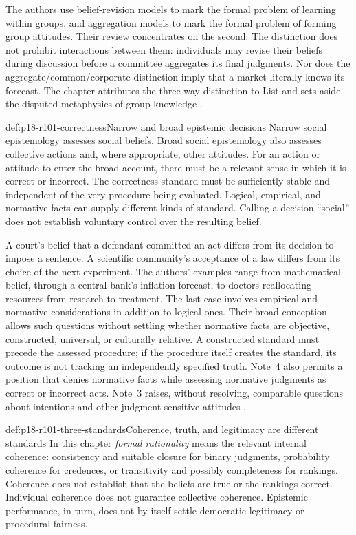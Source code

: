 The authors use belief-revision models to mark the formal problem of
learning within groups, and aggregation models to mark the formal
problem of forming group attitudes. Their review concentrates on the
second. The distinction does not prohibit interactions between them:
individuals may revise their beliefs during discussion before a committee
aggregates its final judgments. Nor does the aggregate/common/corporate
distinction imply that a market literally knows its forecast. The chapter
attributes the three-way distinction to List and sets aside the disputed
metaphysics of group knowledge
\parencite[p.~579]{DietrichSpiekermann2021Social}.

\begin{hbdefinition}{def:p18-r101-correctness}{Narrow and broad epistemic decisions}
Narrow social epistemology assesses social beliefs. Broad social
epistemology also assesses collective actions and, where appropriate,
other attitudes. For an action or attitude to enter the broad account,
there must be a relevant sense in which it is correct or incorrect.
The correctness standard must be sufficiently stable and independent
of the very procedure being evaluated. Logical, empirical, and normative
facts can supply different kinds of standard. Calling a decision
``social'' does not establish voluntary control over the resulting belief.
\end{hbdefinition}

A court's belief that a defendant committed an act differs from its
decision to impose a sentence. A scientific community's acceptance of a
law differs from its choice of the next experiment. The authors' examples
range from mathematical belief, through a central bank's inflation
forecast, to doctors reallocating resources from research to treatment.
The last case involves empirical and normative considerations in addition
to logical ones. Their broad conception allows such questions without
settling whether normative facts are objective, constructed, universal,
or culturally relative. A constructed standard must precede the assessed
procedure; if the procedure itself creates the standard, its outcome is
not tracking an independently specified truth. Note~4 also permits a
position that denies normative facts while assessing normative judgments
as correct or incorrect acts. Note~3 raises, without resolving, comparable
questions about intentions and other judgment-sensitive attitudes
\parencite[pp.~580 and 586--587, nn.~2--4]{DietrichSpiekermann2021Social}.

\begin{hbwarning}{def:p18-r101-three-standards}{Coherence, truth, and legitimacy are different standards}
In this chapter \emph{formal rationality} means the relevant internal
coherence: consistency and suitable closure for binary judgments,
probability coherence for credences, or transitivity and possibly
completeness for rankings. Coherence does not establish that the beliefs
are true or the rankings correct. Individual coherence does not guarantee
collective coherence. Epistemic performance, in turn, does not by itself
settle democratic legitimacy or procedural fairness.
\end{hbwarning}

